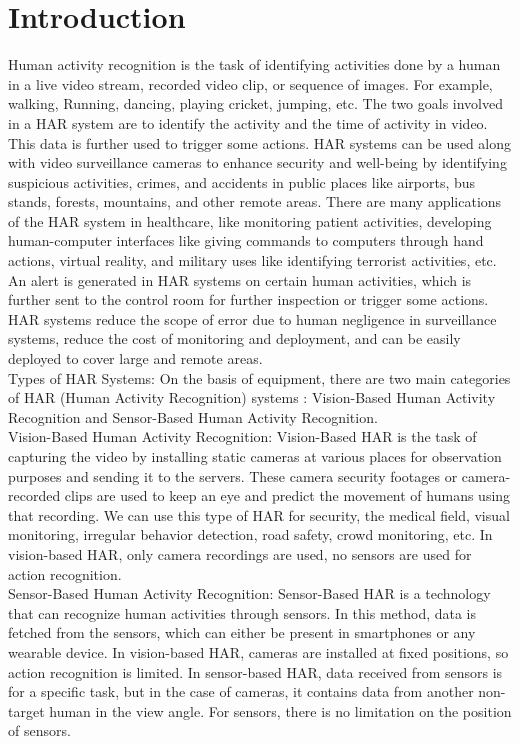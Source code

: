 \documentclass[twocolumn]{article}
\begin{document}
\section{Introduction}
Human activity recognition is the task of identifying activities done by a human in a live video stream, recorded video clip, or sequence of images. For example, walking,
Running, dancing, playing cricket, jumping, etc. The two goals involved in a HAR system are to identify the activity and the time of activity in video. This data is
further used to trigger some actions. HAR systems can be used along with video surveillance cameras to enhance security and well-being by identifying suspicious
activities, crimes, and accidents in public places like airports, bus stands, forests, mountains, and other remote areas. There are many applications of the HAR
system in healthcare, like monitoring patient activities, developing human-computer interfaces like giving commands to computers through hand actions, virtual reality,
and military uses like identifying terrorist activities, etc. An alert is generated in HAR systems on certain human activities, which is further sent to the control room
for further inspection or trigger some actions. HAR systems reduce the scope of error due to human negligence in surveillance systems, reduce the cost of monitoring
and deployment, and can be easily deployed to cover large and remote areas. \\
Types of HAR Systems:
On the basis of equipment, there are two main categories of HAR (Human Activity Recognition) systems :
Vision-Based Human Activity Recognition and Sensor-Based Human Activity Recognition.\\
Vision-Based Human Activity Recognition:
Vision-Based HAR is the task of capturing the video by installing static cameras at various places for observation purposes and sending it to the servers.
These camera security footages or camera-recorded clips are used to keep an eye and predict the movement of humans using that recording. We can use this type of HAR for
security, the medical field, visual monitoring, irregular behavior detection, road safety, crowd monitoring, etc. In vision-based HAR, only camera recordings are used, no
sensors are used for action recognition.\\
Sensor-Based Human Activity Recognition:
Sensor-Based HAR is a technology that can recognize human activities through sensors. In this method, data is fetched from the sensors, which can either be present in
smartphones or any wearable device. In vision-based HAR, cameras are installed at fixed positions, so action recognition is limited. In sensor-based HAR, data received
from sensors is for a specific task, but in the case of cameras, it contains data
from another non-target human in the view angle. For sensors, there is no limitation on the position of sensors.
\end{document}
